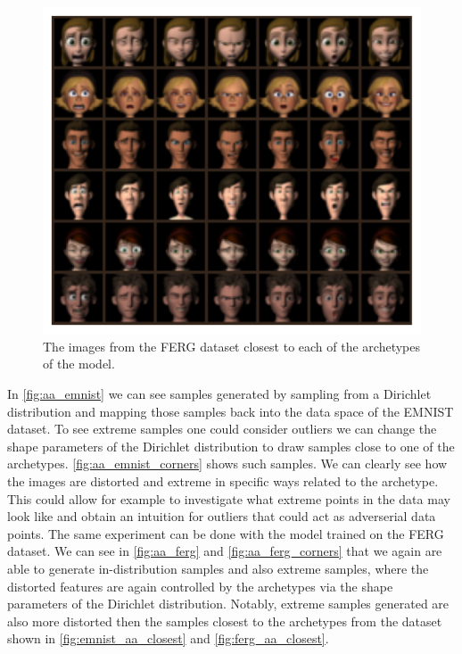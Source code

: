 \begin{figure}[htpb]
	\centering
	\includegraphics{figures/samples/archetypes_ferg_7.pdf}
	\caption{The images from the FERG dataset closest to each of the
		archetypes of the model.}%
	\label{fig:ferg_aa_closest}
\end{figure}

In \autoref{fig:aa_emnist} we can see samples generated by sampling from a
Dirichlet distribution and mapping those samples back into the data space of
the EMNIST dataset. To see extreme samples one could consider outliers we can
change the shape parameters of the Dirichlet distribution to draw samples close
to one of the archetypes. \autoref{fig:aa_emnist_corners} shows such samples.
We can clearly see how the images are distorted and extreme in specific ways
related to the archetype. This could allow for example to investigate what
extreme points in the data may look like and obtain an intuition for outliers
that could act as adverserial data points.
The same experiment can be done with the model trained on the FERG dataset. We
can see in \autoref{fig:aa_ferg} and \autoref{fig:aa_ferg_corners} that we
again are able to generate in-distribution samples and also extreme samples,
where the distorted features are again controlled by the archetypes via the
shape parameters of the Dirichlet distribution. Notably, extreme samples
generated are also more distorted then the samples closest to the archetypes
from the dataset shown in \autoref{fig:emnist_aa_closest} and
\autoref{fig:ferg_aa_closest}.

